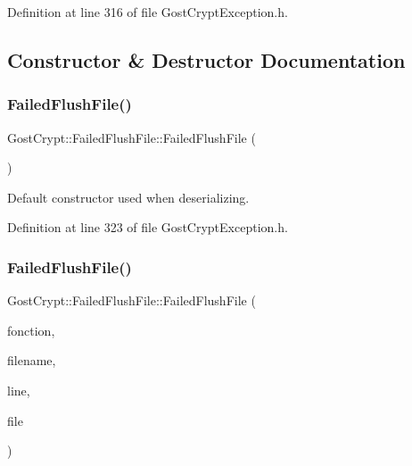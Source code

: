 Definition at line 316 of file Gost\+Crypt\+Exception.\+h.



\subsection{Constructor \& Destructor Documentation}
\mbox{\label{class_gost_crypt_1_1_failed_flush_file_acd0db141f4a0df80ca3b1200f0d74f17}} 
\subsubsection{\texorpdfstring{Failed\+Flush\+File()}{FailedFlushFile()}\hspace{0.1cm}{\footnotesize\ttfamily [1/2]}}
{\footnotesize\ttfamily Gost\+Crypt\+::\+Failed\+Flush\+File\+::\+Failed\+Flush\+File (\begin{DoxyParamCaption}{ }\end{DoxyParamCaption})\hspace{0.3cm}{\ttfamily [inline]}}



Default constructor used when deserializing. 



Definition at line 323 of file Gost\+Crypt\+Exception.\+h.

\mbox{\label{class_gost_crypt_1_1_failed_flush_file_add4ac7354fd7c5a177e9360961d2f731}} 
\subsubsection{\texorpdfstring{Failed\+Flush\+File()}{FailedFlushFile()}\hspace{0.1cm}{\footnotesize\ttfamily [2/2]}}
{\footnotesize\ttfamily Gost\+Crypt\+::\+Failed\+Flush\+File\+::\+Failed\+Flush\+File (\begin{DoxyParamCaption}\item[{Q\+String}]{fonction,  }\item[{Q\+String}]{filename,  }\item[{quint32}]{line,  }\item[{Q\+File\+Info}]{file }\end{DoxyParamCaption})\hspace{0.3cm}{\ttfamily [inline]}}



